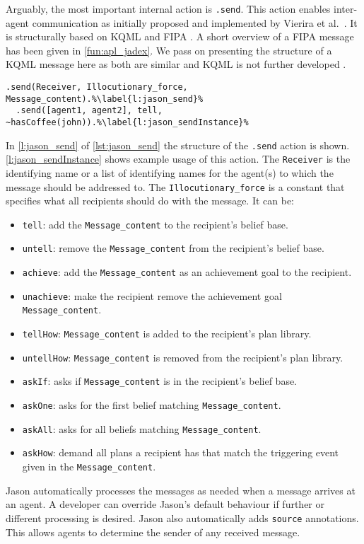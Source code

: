 Arguably, the most important  internal action is \texttt{.send}.
This action enables inter-agent communication as initially proposed and implemented by Vierira et al.~\cite{vieira_formal_2007}.
It is structurally based on KQML and FIPA \cite{fernandez_evaluating_2010}.
A short overview of a FIPA message has been given in \autoref{fun:apl_jadex}.
We pass on presenting the structure of a KQML message here as both are similar and KQML is not further developed \cite{obrien_fipatowards_1998}.
\begin{lstlisting}[caption={Parameters of the internal action \texttt{.send} and an example.}, label=lst:jason_send]
  .send(Receiver, Illocutionary_force, Message_content).%\label{l:jason_send}%
  .send([agent1, agent2], tell, ~hasCoffee(john)).%\label{l:jason_sendInstance}%
\end{lstlisting}
In \autoref{l:jason_send} of \autoref{lst:jason_send} the structure of the \texttt{.send} action is shown.
\autoref{l:jason_sendInstance} shows example usage of this action.
The \texttt{Receiver} is the identifying name or a list of identifying names for the agent(s) to which the message should be addressed to.
The \texttt{Illocutionary\_force} is a constant that specifies what all recipients should do with the message.
It can be:
\begin{itemize}
  \item \texttt{tell}: add the \texttt{Message\_content} to the recipient's belief base.
  \item \texttt{untell}: remove the \texttt{Message\_content} from the recipient's belief base.
  \item \texttt{achieve}: add the \texttt{Message\_content} as an achievement goal to the recipient.
  \item \texttt{unachieve}: make the recipient remove the achievement goal \texttt{Message\_content}.
  \item \texttt{tellHow}: \texttt{Message\_content} is added to the recipient's plan library.
  \item \texttt{untellHow}: \texttt{Message\_content} is removed from the recipient's plan library.
  \item \texttt{askIf}: asks if \texttt{Message\_content} is in the recipient's belief base.
  \item \texttt{askOne}: asks for the first belief matching \texttt{Message\_content}.
  \item \texttt{askAll}: asks for all beliefs matching \texttt{Message\_content}.
  \item \texttt{askHow}: demand all plans a recipient has that match the triggering event given in the \texttt{Message\_content}.
\end{itemize}
Jason automatically processes the messages as needed when a message arrives at an agent.
A developer can override Jason's default behaviour if further or different processing is desired.
Jason also automatically adds \texttt{source} annotations.
This allows agents to determine the sender of any received message.

